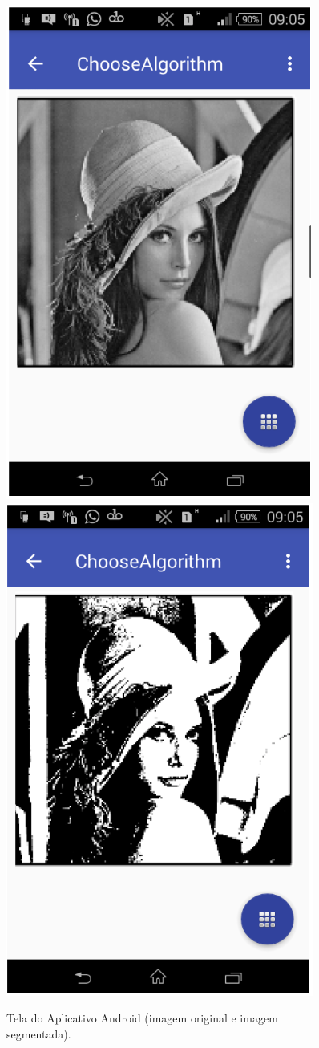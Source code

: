   \begin{figure}[!htb]
       \begin{center}  
          \includegraphics[width=0.2\columnwidth]{img/tela_android-original.png} \quad
          \includegraphics[width=0.2\columnwidth]{img/tela_android.png}
           \caption{\label{fig:tela_android}Tela do Aplicativo Android (imagem original e imagem segmentada).}
       \end{center}
   \end{figure}



